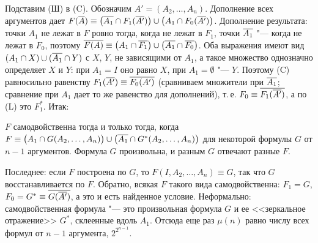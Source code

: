 \begin{solution}[2 (\S\,3)]
Подставим (Ш) в (C). Обозначим $A'=(A_2,\dots,A_n)$. Дополнение всех
аргументов дает
$F(\overline{A})\equiv\bigl(\overline{A_1}\cap F_1(\overline{A'})\bigr)\cup\bigl(A_1\cap F_0(\overline{A'})\bigr)$.
Дополнение результата: точки $A_1$ не лежат в $F$ ровно тогда, когда не
лежат в $F_1$, точки $\overline{A_1}$ "--- когда не лежат в $F_0$, поэтому
$\overline{F(A)}\equiv\bigl(A_1\cap\overline{F_1}\bigr)\cup\bigl(\overline{A_1}\cap\overline{F_0}\bigr)$.
Оба выражения имеют вид $(A_1\cap X)\cup(\overline{A_1}\cap Y)$ с $X$, $Y$,
не зависящими от $A_1$, а такое множество однозначно определяет $X$ и $Y$:
при $A_1=I$ оно равно $X$, при $A_1=\emptyset$ "--- $Y$. Поэтому (C)
равносильно равенству $F_1(\overline{A'})\equiv\overline{F_0(A')}$ (сравниваем
множители при $\overline{A_1}$; сравнение при $A_1$ дает то же равенство для
дополнений), т.\,е. $F_0\equiv\overline{F_1(\overline{A'})}$, а по (L) это $F_1^*$.
Итак:
\begin{keystmt}
$F$ самодвойственна тогда и только тогда, когда
$F\equiv\bigl(A_1\cap G(A_2,\dots,A_n)\bigr)\cup\bigl(\overline{A_1}\cap G^*(A_2,\dots,A_n)\bigr)$
для некоторой формулы $G$ от $n-1$ аргументов. Формула $G$ произвольна,
и разным $G$ отвечают разные $F$.
\end{keystmt}
Последнее: если $F$ построена по $G$, то $F(I,A_2,\dots,A_n)\equiv G$, так что
$G$ восстанавливается по $F$. Обратно, всякая $F$ такого вида
самодвойственна: $F_1=G$, $F_0=G^*\equiv\overline{G(\overline{A'})}$, а это и есть
найденное условие. Неформально: самодвойственная формула "--- это
произвольная формула $G$ и ее <<зеркальное отражение>> $G^*$, склеенные
вдоль $A_1$. Отсюда еще раз $\mu(n)$ равно числу всех формул от $n-1$
аргумента, $2^{2^{n-1}}$.


\end{solution}
